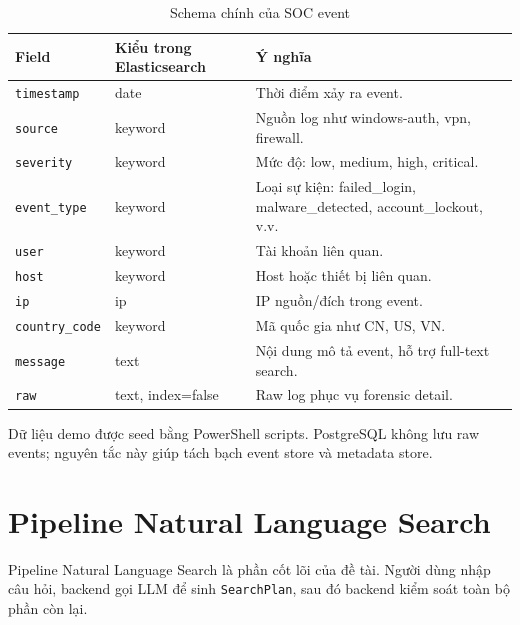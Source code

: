 \documentclass[12pt,a4paper]{report}
\begin{document}
\begin{table}[H]
\centering
\caption{Schema chính của SOC event}
\begin{tabular}{p{4cm}p{4cm}p{6cm}}
\toprule
\textbf{Field} & \textbf{Kiểu trong Elasticsearch} & \textbf{Ý nghĩa} \\
\midrule
\texttt{timestamp} & date & Thời điểm xảy ra event. \\
\texttt{source} & keyword & Nguồn log như windows-auth, vpn, firewall. \\
\texttt{severity} & keyword & Mức độ: low, medium, high, critical. \\
\texttt{event\_type} & keyword & Loại sự kiện: failed\_login, malware\_detected, account\_lockout, v.v. \\
\texttt{user} & keyword & Tài khoản liên quan. \\
\texttt{host} & keyword & Host hoặc thiết bị liên quan. \\
\texttt{ip} & ip & IP nguồn/đích trong event. \\
\texttt{country\_code} & keyword & Mã quốc gia như CN, US, VN. \\
\texttt{message} & text & Nội dung mô tả event, hỗ trợ full-text search. \\
\texttt{raw} & text, index=false & Raw log phục vụ forensic detail. \\
\bottomrule
\end{tabular}
\end{table}

Dữ liệu demo được seed bằng PowerShell scripts. PostgreSQL không lưu raw events; nguyên tắc này giúp tách bạch event store và metadata store.

\section{Pipeline Natural Language Search}

Pipeline Natural Language Search là phần cốt lõi của đề tài. Người dùng nhập câu hỏi, backend gọi LLM để sinh \texttt{SearchPlan}, sau đó backend kiểm soát toàn bộ phần còn lại.
\end{document}
